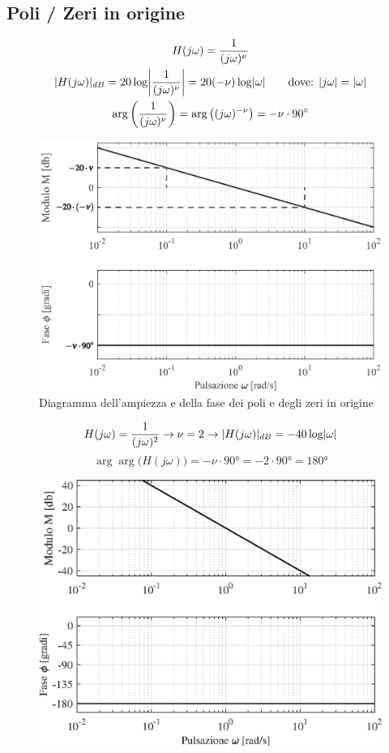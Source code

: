 \subsection{Poli / Zeri in origine}

\begin{gather*}
	H(j\omega) = \frac{1}{(j\omega)^\nu}\\
	\abs{H(j\omega)}_{dB} = 20 \log \Abs{\frac{1}{(j\omega)^\nu}} = 20 ( -\nu) \log \abs{\omega} \qquad \text{dove: }\abs{j\omega}=\abs{\omega}\\
	\arg \bigg(\frac{1}{(j\omega)^\nu}\bigg) = \arg \big((j\omega)^{-\nu}\big) = -\nu \cdot \ang{90} 
\end{gather*}

\begin{figure}[H]
	\centering
	\includegraphics[width=0.8\linewidth]{immagini/cap6_Bode/bodeZPOrig.eps}
	\caption{ Diagramma dell'ampiezza e della fase dei poli e degli zeri in origine}
	\label{fig:bodeZPOrig}
\end{figure}

\begin{nexample}
	\[ H(j\omega) = \frac{1}{(j\omega)^2} \rightarrow \nu = 2 \rightarrow \lvert H(j\omega)\rvert_{dB} = -40 \log \lvert\omega\rvert\]
	\[ \arg \arg \big(H(j\omega)\big) =-\nu \cdot \ang{90} =-2\cdot \ang{90} =\ang{180}  \]
\begin{figure}[H]
	\centering
	\includegraphics[width=0.7\linewidth]{immagini/cap6_Bode/es1.eps}
	\label{fig:Bode_es1}
\end{figure}
\end{nexample}


